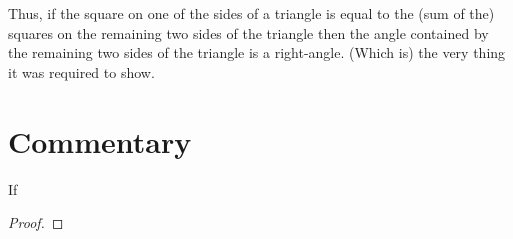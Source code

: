 Thus, if the square on one of the sides of a triangle is equal to the (sum of the)
squares on the remaining two sides of the triangle then the angle contained
by the remaining two sides of the triangle is a right-angle. (Which is) the very thing
it was required to show.


\section*{Commentary}

\begin{proposition}\label{proposition_48}\leanok
    If
\end{proposition}
\begin{proof}
    \leanok
\end{proof}
